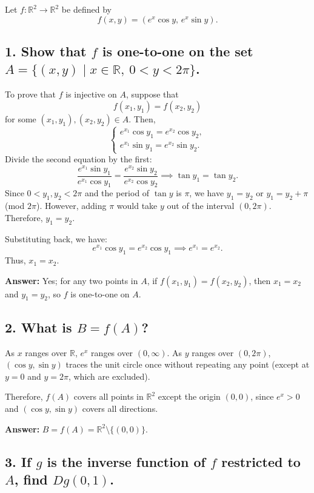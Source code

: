 \documentclass[lang=en,11pt]{template}
\begin{document}
Let \( f : \mathbb{R}^2 \to \mathbb{R}^2 \) be defined by
\[ f(x, y) = \left( e^x \cos y, \, e^x \sin y \right). \]

\subsection*{1. Show that \( f \) is one-to-one on the set \( A = \{ (x, y) \mid x \in \mathbb{R},\ 0 < y < 2\pi \} \).}

To prove that \( f \) is injective on \( A \), suppose that
\[
f(x_1, y_1) = f(x_2, y_2)
\]
for some \( (x_1, y_1), (x_2, y_2) \in A \). Then,
\[
\begin{cases}
e^{x_1} \cos y_1 = e^{x_2} \cos y_2, \\
e^{x_1} \sin y_1 = e^{x_2} \sin y_2.
\end{cases}
\]
Divide the second equation by the first:
\[
\frac{e^{x_1} \sin y_1}{e^{x_1} \cos y_1} = \frac{e^{x_2} \sin y_2}{e^{x_2} \cos y_2} \implies \tan y_1 = \tan y_2.
\]
Since \( 0 < y_1, y_2 < 2\pi \) and the period of \( \tan y \) is \( \pi \), we have \( y_1 = y_2 \) or \( y_1 = y_2 + \pi \) (mod \( 2\pi \)). However, adding \( \pi \) would take \( y \) out of the interval \( (0, 2\pi) \). Therefore, \( y_1 = y_2 \).

Substituting back, we have:
\[
e^{x_1} \cos y_1 = e^{x_2} \cos y_1 \implies e^{x_1} = e^{x_2}.
\]
Thus, \( x_1 = x_2 \).

\textbf{Answer:} Yes; for any two points in \( A \), if \( f(x_1, y_1) = f(x_2, y_2) \), then \( x_1 = x_2 \) and \( y_1 = y_2 \), so \( f \) is one-to-one on \( A \).

\subsection*{2. What is \( B = f(A) \)?}

As \( x \) ranges over \( \mathbb{R} \), \( e^x \) ranges over \( (0, \infty) \). As \( y \) ranges over \( (0, 2\pi) \), \( (\cos y, \sin y) \) traces the unit circle once without repeating any point (except at \( y = 0 \) and \( y = 2\pi \), which are excluded).

Therefore, \( f(A) \) covers all points in \( \mathbb{R}^2 \) except the origin \( (0, 0) \), since \( e^x > 0 \) and \( (\cos y, \sin y) \) covers all directions.

\textbf{Answer:} \( B = f(A) = \mathbb{R}^2 \setminus \{ (0, 0) \} \).

\subsection*{3. If \( g \) is the inverse function of \( f \) restricted to \( A \), find \( Dg(0, 1) \).}
\end{document}
